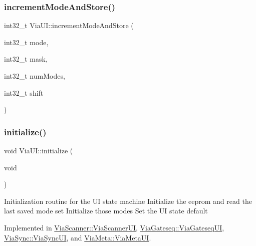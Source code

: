 \subsubsection{\texorpdfstring{increment\+Mode\+And\+Store()}{incrementModeAndStore()}}
{\footnotesize\ttfamily int32\+\_\+t Via\+U\+I\+::increment\+Mode\+And\+Store (\begin{DoxyParamCaption}\item[{int32\+\_\+t}]{mode,  }\item[{int32\+\_\+t}]{mask,  }\item[{int32\+\_\+t}]{num\+Modes,  }\item[{int32\+\_\+t}]{shift }\end{DoxyParamCaption})}

\mbox{\label{class_via_u_i_a573ba7aef8f4982ec4900258c770bdbb}} 
\subsubsection{\texorpdfstring{initialize()}{initialize()}}
{\footnotesize\ttfamily void Via\+U\+I\+::initialize (\begin{DoxyParamCaption}\item[{void}]{ }\end{DoxyParamCaption})\hspace{0.3cm}{\ttfamily [pure virtual]}}

Initialization routine for the UI state machine Initialize the eeprom and read the last saved mode set Initialize those modes Set the UI state default 

Implemented in \mbox{\hyperlink{class_via_scanner_1_1_via_scanner_u_i_ab12af2665a9e58574cd0cb4b8a003e0b}{Via\+Scanner\+::\+Via\+Scanner\+UI}}, \mbox{\hyperlink{class_via_gateseq_1_1_via_gateseq_u_i_ae59b0d739f92892cf9a0d16cd3d25bfa}{Via\+Gateseq\+::\+Via\+Gateseq\+UI}}, \mbox{\hyperlink{class_via_sync_1_1_via_sync_u_i_a0d9dbe5a0b663acc88b45b46f440db78}{Via\+Sync\+::\+Via\+Sync\+UI}}, and \mbox{\hyperlink{class_via_meta_1_1_via_meta_u_i_ac2bc1bfeb6ef0045d234bd5b89f9ec99}{Via\+Meta\+::\+Via\+Meta\+UI}}.

\mbox{\label{class_via_u_i_aecfaa511595dcab4d38caff73abdd54b}} 
